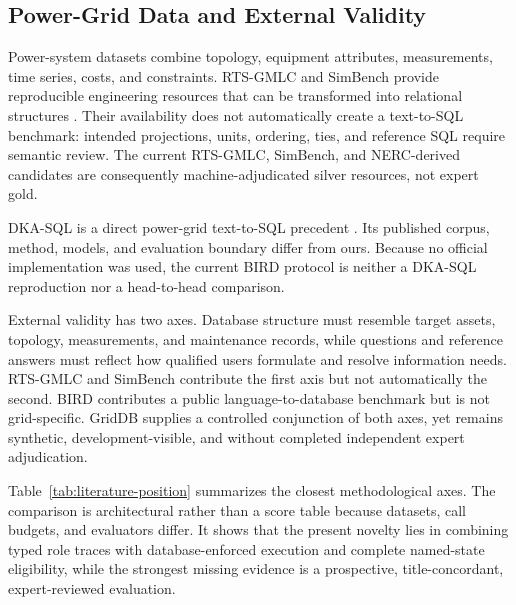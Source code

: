 \documentclass[applsci,article,submit,moreauthors]{Definitions/mdpi}
\begin{document}
\subsection{Power-Grid Data and External Validity}

Power-system datasets combine topology, equipment attributes, measurements, time series, costs, and constraints. RTS-GMLC and SimBench provide reproducible engineering resources that can be transformed into relational structures \cite{barrows2020rts,meinecke2020simbench}. Their availability does not automatically create a text-to-SQL benchmark: intended projections, units, ordering, ties, and reference SQL require semantic review. The current RTS-GMLC, SimBench, and NERC-derived candidates are consequently machine-adjudicated silver resources, not expert gold.

DKA-SQL is a direct power-grid text-to-SQL precedent \cite{bian2025dkasql}. Its published corpus, method, models, and evaluation boundary differ from ours. Because no official implementation was used, the current BIRD protocol is neither a DKA-SQL reproduction nor a head-to-head comparison.

External validity has two axes. Database structure must resemble target assets, topology, measurements, and maintenance records, while questions and reference answers must reflect how qualified users formulate and resolve information needs. RTS-GMLC and SimBench contribute the first axis but not automatically the second. BIRD contributes a public language-to-database benchmark but is not grid-specific. GridDB supplies a controlled conjunction of both axes, yet remains synthetic, development-visible, and without completed independent expert adjudication.

Table~\ref{tab:literature-position} summarizes the closest methodological axes. The comparison is architectural rather than a score table because datasets, call budgets, and evaluators differ. It shows that the present novelty lies in combining typed role traces with database-enforced execution and complete named-state eligibility, while the strongest missing evidence is a prospective, title-concordant, expert-reviewed evaluation.
\end{document}

